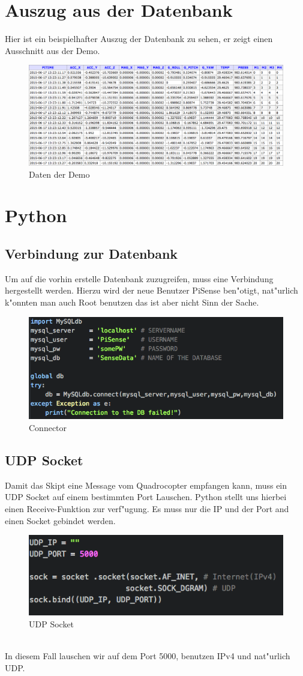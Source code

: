 \documentclass[oneside, a4paper, 11pt]{report}
\begin{document}
		\section{Auszug aus der Datenbank}
			Hier ist ein beispielhafter Auszug der Datenbank zu sehen, er zeigt einen Ausschnitt aus der Demo.
			\begin{figure}[h!]
				\centering
				\includegraphics[width=0.9\linewidth]{img/bsptbl.png}
				\caption{Daten der Demo\label{demo_data}}
			\end{figure} 
		\section{Python}
			\subsection{Verbindung zur Datenbank}
				Um auf die vorhin erstelle Datenbank zuzugreifen, muss eine Verbindung hergestellt werden. Hierzu wird der neue Benutzer PiSense ben"otigt, nat"urlich k"onnten man auch Root benutzen das ist aber nicht Sinn der Sache.
				\begin{figure}[h!]
					\centering
					\includegraphics[width=0.65\linewidth]{img/dbc.png}
					\caption{Connector\label{dbc}}
				\end{figure}
			\newpage
			\subsection{UDP Socket}
				Damit das Skipt eine Message vom Quadrocopter empfangen kann, muss ein UDP Socket auf einem bestimmten Port Lauschen. Python stellt uns hierbei einen Receive-Funktion zur verf"ugung. Es muss nur die IP und der Port and einen Socket gebindet werden. 
				\begin{figure}[h!]
					\centering
					\includegraphics[width=0.65\linewidth]{img/udpsock.png}
					\caption{UDP Socket\label{UDPS}}
				\end{figure}\\
				In diesem Fall lauschen wir auf dem Port 5000, benutzen IPv4 und nat"urlich UDP.
\end{document}
